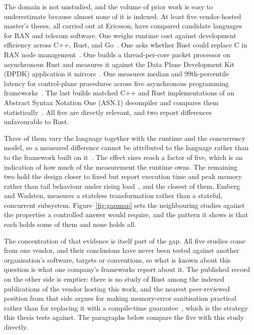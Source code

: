 \documentclass[english,oneside,a4paper,censored,csm,software-track-2020]{HYthesisML}
\begin{document}
The domain is not unstudied, and the volume of prior work is easy to underestimate because
almost none of it is indexed. At least five vendor-hosted master's theses, all carried out at
Ericsson, have compared candidate languages for RAN and telecom software. One weighs runtime
cost against development efficiency across C++, Rust, and Go~\cite{karlback2021ran}. One asks
whether Rust could replace C in RAN node management~\cite{olsson2023ranmgmt}. One builds a
thread-per-core packet processor on asynchronous Rust and measures it against the Data Plane
Development Kit (DPDK) application it mirrors~\cite{olsson2023asyncpackets}. One measures median and 99th-percentile
latency for control-plane procedures across five asynchronous programming
frameworks~\cite{arvidsson2025async}. The last builds matched C++ and Rust implementations of an
Abstract Syntax Notation One (ASN.1) decompiler and compares them
statistically~\cite{emberg2023asn1}. All five are directly
relevant, and two report differences unfavourable to Rust.

Three of them vary the language together with the runtime and the concurrency model, so a
measured difference cannot be attributed to the language rather than to the framework built on
it~\cite{karlback2021ran,olsson2023asyncpackets,arvidsson2025async}. The effect sizes reach a
factor of five, which is an indication of how much of the measurement the runtime owns. The
remaining two hold the design closer to fixed but report execution time and peak memory rather
than tail behaviour under rising load~\cite{olsson2023ranmgmt,emberg2023asn1}, and the closest
of them, Emberg and Wadsten, measures a stateless transformation rather than a stateful,
concurrent subsystem. Figure~\ref{fig:gapmap} sets the neighbouring studies against the
properties a controlled answer would require, and the pattern it shows is that each holds some
of them and none holds all.

The concentration of that evidence is itself part of the gap. All five studies come from one
vendor, and their conclusions have never been tested against another organisation's software,
targets or conventions, so what is known about this question is what one company's frameworks
report about it. The published record on the other side is emptier: there is no study of Rust
among the indexed publications of the vendor hosting this work, and the nearest peer-reviewed
position from that side argues for making memory-error sanitisation practical rather than for
replacing it with a compile-time guarantee~\cite{gjomemo2016mesc}, which is the strategy this
thesis tests against. The paragraphs below compare the five with this study directly.
\end{document}
